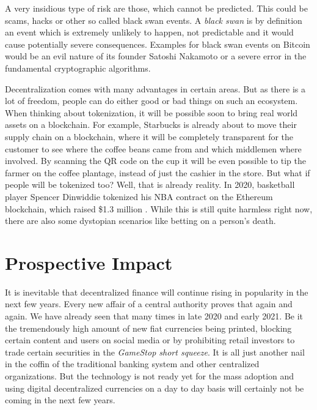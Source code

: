 A very insidious type of risk are those, which cannot be predicted. This could be scams, hacks or other so called black swan events. A \textit{black swan} is by definition an event which is extremely unlikely to happen, not predictable and it would cause potentially severe consequences.
Examples for black swan events on Bitcoin would be an evil nature of its founder Satoshi Nakamoto or a severe error in the fundamental
cryptographic algorithms.

Decentralization comes with many advantages in certain areas. But as there is a lot of freedom, people can do either good or bad things on such
an ecosystem. When thinking about tokenization, it will be possible soon to bring real world assets on a blockchain. For example, Starbucks is
already about to move their supply chain on a blockchain, where it will be completely transparent for the customer to see where the coffee beans
came from and which middlemen where involved. By scanning the QR code on the cup it will be even possible to tip the farmer on the coffee
plantage, instead of just the cashier in the store. But what if people will be tokenized too? Well, that is already reality. In 2020, basketball
player Spencer Dinwiddie tokenized his NBA contract on the Ethereum blockchain, which raised \$1.3 million \cite{Redman2020}. While this is still
quite harmless right now, there are also some dystopian scenarios like betting on a person's death.

\section{Prospective Impact}
It is inevitable that decentralized finance will continue rising in popularity in the next few years. Every new affair of a central authority
proves that again and again. We have already seen that many times in late 2020 and early 2021. Be it the tremendously high amount of new fiat
currencies being printed, blocking certain content and users on social media or by prohibiting retail investors to trade certain securities in
the \textit{GameStop short squeeze}. It is all just another nail in the coffin of the traditional banking system and other centralized organizations.
But the technology is not ready yet for the mass adoption and using digital decentralized currencies on a day to day basis will certainly not
be coming in the next few years.